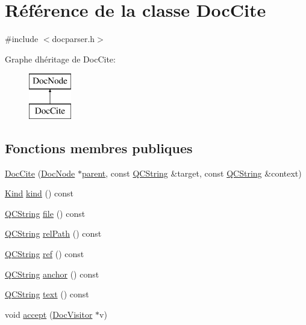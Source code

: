 \hypertarget{class_doc_cite}{}\section{Référence de la classe Doc\+Cite}
\label{class_doc_cite}


{\ttfamily \#include $<$docparser.\+h$>$}

Graphe d\textquotesingle{}héritage de Doc\+Cite\+:\begin{figure}[H]
\begin{center}
\leavevmode
\includegraphics[height=2.000000cm]{class_doc_cite}
\end{center}
\end{figure}
\subsection*{Fonctions membres publiques}
\begin{DoxyCompactItemize}
\item 
\hyperlink{class_doc_cite_aba1aec0ac228dd1e707a5572fe199724}{Doc\+Cite} (\hyperlink{class_doc_node}{Doc\+Node} $\ast$\hyperlink{class_doc_node_a990d8b983962776a647e6231d38bd329}{parent}, const \hyperlink{class_q_c_string}{Q\+C\+String} \&target, const \hyperlink{class_q_c_string}{Q\+C\+String} \&context)
\item 
\hyperlink{class_doc_node_aebd16e89ca590d84cbd40543ea5faadb}{Kind} \hyperlink{class_doc_cite_ad4ed29144c44f63665be6d2995994217}{kind} () const 
\item 
\hyperlink{class_q_c_string}{Q\+C\+String} \hyperlink{class_doc_cite_ab4cf66530f31d96ffdaf84782ece0e7e}{file} () const 
\item 
\hyperlink{class_q_c_string}{Q\+C\+String} \hyperlink{class_doc_cite_acfe5b0fa7df0b72402ca250ea726a780}{rel\+Path} () const 
\item 
\hyperlink{class_q_c_string}{Q\+C\+String} \hyperlink{class_doc_cite_a58e34fdb63ae55fdd4f90a82abaa6ec2}{ref} () const 
\item 
\hyperlink{class_q_c_string}{Q\+C\+String} \hyperlink{class_doc_cite_a61bd768525f232b99a552628aec926cd}{anchor} () const 
\item 
\hyperlink{class_q_c_string}{Q\+C\+String} \hyperlink{class_doc_cite_abb29dfbe196c3ada049ec9c1443d52b9}{text} () const 
\item 
void \hyperlink{class_doc_cite_a0f18374c2b9d937c71e317b9d36f1647}{accept} (\hyperlink{class_doc_visitor}{Doc\+Visitor} $\ast$v)
\end{DoxyCompactItemize}
